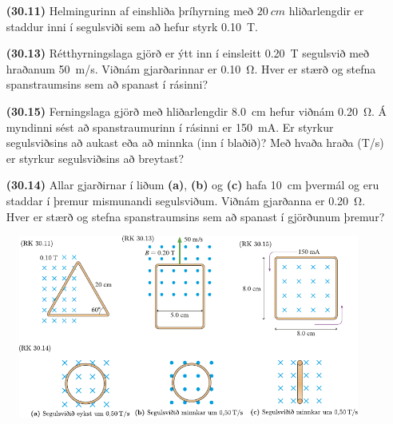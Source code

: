 \ifdefined \wholebook \else\documentclass[oneside]{book}\usepackage{EdlBook}\graphicspath{{figures/}}
\begin{document}
\begin{enumerate}[label = \textbf{(\alph*)}]

\item[\textbf{(30.11)}] Helmingurinn af einshliða þríhyrning með $\SI{20}{cm}$ hliðarlengdir er staddur inni í segulsviði sem að hefur styrk \SI{0.10}{T}. 

\item[\textbf{(30.13)}] Rétthyrningslaga gjörð er ýtt inn í einsleitt \SI{0.20}{T} segulsvið með hraðanum \SI{50}{m/s}. Viðnám gjarðarinnar er \SI{0.10}{\ohm}. Hver er stærð og stefna spanstraumsins sem að spanast í rásinni?

\item[\textbf{(30.15)}] Ferningslaga gjörð með hliðarlengdir \SI{8.0}{cm} hefur viðnám \SI{0.20}{\ohm}. Á myndinni sést að spanstraumurinn í rásinni er \SI{150}{mA}. Er styrkur segulsviðsins að aukast eða að minnka (inn í blaðið)? Með hvaða hraða (\si{T/s}) er styrkur segulsviðsins að breytast?

\item[\textbf{(30.14)}] Allar gjarðirnar í liðum \textbf{(a)}, \textbf{(b)} og \textbf{(c)} hafa \SI{10}{cm} þvermál og eru staddar í þremur mismunandi segulsviðum. Viðnám gjarðanna er \SI{0.20}{\ohm}. Hver er stærð og stefna spanstraumsins sem að spanast í gjörðunum þremur?


\end{enumerate}

\begin{figure}[H]
    \centering
    \includegraphics[scale = 1.15]{figures/rk3011.pdf}
\end{figure}
\end{document}
